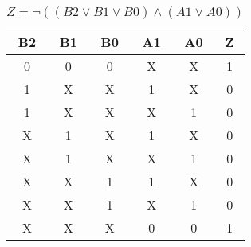 
\begin{center}
    \begin{table}[h] \caption{\(Z = \lnot ((B2 \lor B1 \lor B0) \land (A1 \lor A0)) \)}
        \begin{center}
            \begin{tabular}{|c|c|c|c|c||c|} \hline
            B2 & B1 & B0 & A1 & A0 & Z \\ \hline\hline
            0  & 0  & 0  & X  & X  & 1\\ \hline
            1  & X  & X  & 1  & X  & 0\\ \hline
            1  & X  & X  & X  & 1  & 0\\ \hline
            X  & 1  & X  & 1  & X  & 0\\ \hline
            X  & 1  & X  & X  & 1  & 0\\ \hline
            X  & X  & 1  & 1  & X  & 0\\ \hline
            X  & X  & 1  & X  & 1  & 0\\ \hline
            X  & X  & X  & 0  & 0  & 1\\ \hline
            \end{tabular}
        \end{center}
    \end{table}
\end{center}
